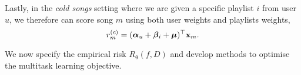 Lastly, %
in the \emph{cold songs} setting where we are given a specific playlist $i$ from user $u$,
we therefore can score song $m$ using both user weights and playlists weights, \ie
\begin{equation}
\label{eq:cs}
r_m^{(c)} = ({\bm{\alpha}}_u + {\bm{\beta}}_i + \bm{\mu})^\top \mathbf{x}_m.
\end{equation}




We now specify the empirical risk $R_{\uptheta}(f, D)$ %
and develop methods to optimise the multitask learning objective.


